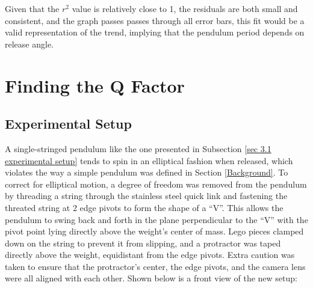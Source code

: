 \documentclass[11pt]{article}
\begin{document}
\begin{multicols}{2}
Given that the $r^2$ value is relatively close to 1, the residuals are both small and consistent, and the graph passes passes through all error bars, this fit would be a valid representation of the trend, implying that the pendulum period depends on release angle.

\section{Finding the Q Factor} \label{sec 4 Finding the Q Factor}

\subsection{Experimental Setup} \label{sec 4.1 experimental setup}
A single-stringed pendulum like the one presented in Subsection \ref{sec 3.1 experimental setup} tends to spin in an elliptical fashion when released, which violates the way a simple pendulum was defined in Section \ref{Background}. To correct for elliptical motion, a degree of freedom was removed from the pendulum by threading a string through the stainless steel quick link and fastening the threated string at 2 edge pivots to form the shape of a ``V''. This allows the pendulum to swing back and forth in the plane perpendicular to the ``V'' with the pivot point lying directly above the weight's center of mass. Lego pieces clamped down on the string to prevent it from slipping, and a protractor was taped directly above the weight, equidistant from the edge pivots. Extra caution was taken to ensure that the protractor's center, the edge pivots, and the camera lens were all aligned with each other. Shown below is a front view of the new setup:


\end{multicols}
\end{document}
